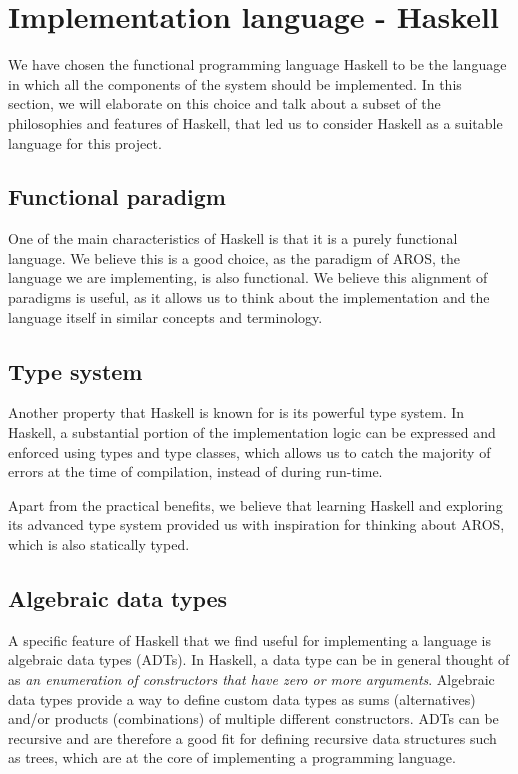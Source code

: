 \section{Implementation language - Haskell}
\label{sec:haskell}
We have chosen the functional programming language Haskell to be the language in which all the components of the system should be implemented. In this section, we will elaborate on this choice and talk about a subset of the philosophies and features of Haskell, that led us to consider Haskell as a suitable language for this project.
\subsection{Functional paradigm}
One of the main characteristics of Haskell is that it is a purely functional language. We believe this is a good choice, as the paradigm of AROS, the language we are implementing, is also functional. We believe this alignment of paradigms is useful, as it allows us to think about the implementation and the language itself in similar concepts and terminology. 
\subsection{Type system}
Another property that Haskell is known for is its powerful type system. In Haskell, a substantial portion of the implementation logic can be expressed and enforced using types and type classes, which allows us to catch the majority of errors at the time of compilation, instead of during run-time.
\par
Apart from the practical benefits, we believe that learning Haskell and exploring its advanced type system provided us with inspiration for thinking about AROS, which is also statically typed.
\subsection{Algebraic data types}
A specific feature of Haskell that we find useful for implementing a language is algebraic data types (ADTs). In Haskell, a data type can be in general thought of as \textit{an enumeration of constructors that have zero or more arguments}. Algebraic data types provide a way to define custom data types as sums (alternatives) and/or products (combinations) of multiple different constructors. ADTs can be recursive and are therefore a good fit for defining recursive data structures such as trees, which are at the core of implementing a programming language. \cite{allen2016haskell}

